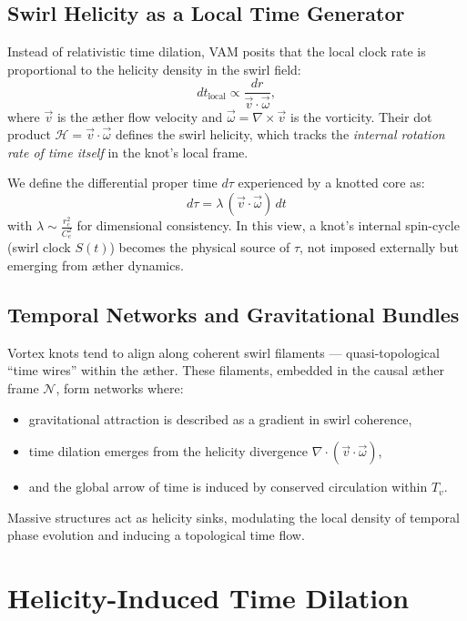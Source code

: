 \documentclass[12pt]{article}
\begin{document}
\subsection*{Swirl Helicity as a Local Time Generator}

Instead of relativistic time dilation, VAM posits that the local clock rate is proportional to the helicity density in the swirl field:
\[
    dt_{\text{local}} \propto \frac{dr}{\vec{v} \cdot \vec{\omega}},
\]
where \( \vec{v} \) is the æther flow velocity and \( \vec{\omega} = \nabla \times \vec{v} \) is the vorticity. Their dot product \( \mathcal{H} = \vec{v} \cdot \vec{\omega} \) defines the swirl helicity, which tracks the \emph{internal rotation rate of time itself} in the knot’s local frame.

We define the differential proper time \( d\tau \) experienced by a knotted core as:
\[
    \boxed{
    d\tau = \lambda \, (\vec{v} \cdot \vec{\omega}) \, dt
    }
\]
with \( \lambda \sim \frac{r_c^2}{C_e^2} \) for dimensional consistency. In this view, a knot's internal spin-cycle (swirl clock \( S(t) \)) becomes the physical source of \( \tau \), not imposed externally but emerging from æther dynamics.

\subsection*{Temporal Networks and Gravitational Bundles}

Vortex knots tend to align along coherent swirl filaments — quasi-topological “time wires” within the æther. These filaments, embedded in the causal æther frame \( \mathcal{N} \), form networks where:
\begin{itemize}
  \item gravitational attraction is described as a gradient in swirl coherence,
  \item time dilation emerges from the helicity divergence \( \nabla \cdot (\vec{v} \cdot \vec{\omega}) \),
  \item and the global arrow of time is induced by conserved circulation within \( T_v \).
\end{itemize}

Massive structures act as helicity sinks, modulating the local density of temporal phase evolution and inducing a topological time flow.

\section{Helicity-Induced Time Dilation}
\end{document}
